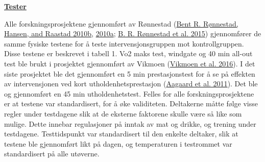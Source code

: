 \documentclass[
]{book}
\begin{document}
\underline{\textbf{Tester}}

Alle forskningsprosjektene gjennomført av Rønnestad
(\protect\hyperlink{ref-ruxf8nnestad2010a}{Bent R. Rønnestad, Hansen,
and Raastad 2010b}, \protect\hyperlink{ref-ruxf8nnestad2010b}{2010a};
\protect\hyperlink{ref-ruxf8nnestad2015}{B. R. Rønnestad et al. 2015})
gjennomfører de samme fysiske testene for å teste intervensjonsgruppen
mot kontrollgruppen. Disse testene er beskrevet i tabell 1. Vo2 maks
test, windgate og 40 min all-out test ble brukt i prosjektet gjennomført
av Vikmoen (\protect\hyperlink{ref-vikmoen2016}{Vikmoen et al. 2016}). I
det siste prosjektet ble det gjennomført en 5 min prestasjonstest for å
se på effekten av intervensjonen ved kort utholdenhetsprestasjon
(\protect\hyperlink{ref-aagaard2011}{Aagaard et al. 2011}). Det ble og
gjennomført en 45 min utholdenhetstest. Felles for alle
forskningsprosjektene er at testene var standardisert, for å øke
validiteten. Deltakerne måtte følge visse regler under testdagene slik
at de eksterne faktorene skulle være så like som mulige. Dette innebar
regulasjoner på inntak av mat og drikke, og trening under testdagene.
Testtidspunkt var standardisert til den enkelte deltaker, slik at
testene ble gjennomført likt på dagen, og temperaturen i testrommet var
standardisert på alle utøverne.
\end{document}
